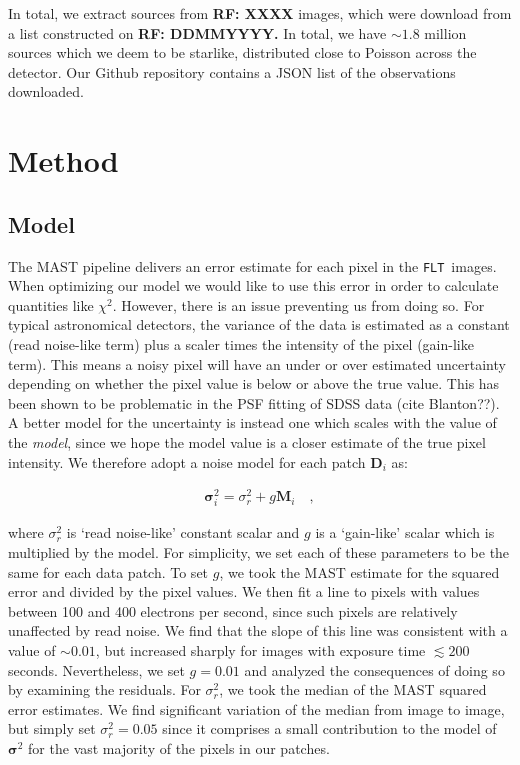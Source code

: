 \documentclass[12pt,letterpaper,preprint]{aastex}
\newcommand{\rf}[1]{\textbf{RF: #1}}
\newcommand{\vect}[1]{\mathbf{#1}}
\newcommand{\FLT}{\texttt{FLT}}
\newcommand{\data}{\vect{D}}
\newcommand{\model}{\vect{M}}
\newcommand{\var}{\vect{\sigma}^2}
\begin{document}
In total, we extract sources from \rf{XXXX} images, which were download from a list constructed on 
\rf{DDMMYYYY.}  In total, we have $\sim1.8$ million sources which we deem to be starlike, distributed 
close to Poisson across the detector.  Our Github repository contains a JSON list of the observations 
downloaded.

\section{Method}

\subsection{Model}

The MAST pipeline delivers an error estimate for each pixel in the \FLT\ images.   When optimizing 
our model we would like to use this error in order to calculate quantities like $\chi^2$.  However, 
there is an issue preventing us from doing so.  For typical astronomical detectors, the variance of 
the data is estimated as a constant (read noise-like term) plus a scaler times the intensity of the pixel 
(gain-like term).  This means a noisy pixel will have an under or over estimated uncertainty depending 
on whether the pixel value is below or above the true value.  This has been shown to be 
problematic in the PSF fitting of SDSS data (cite Blanton??).  A better model for the uncertainty is 
instead one which scales with the value of the \emph{model}, since we hope the model value is a 
closer estimate of the true pixel intensity.  We therefore adopt a noise model for each patch $\data_i$
as:

\begin{eqnarray}
\var_i =  \sigma_{r}^2 + g \model_i
\quad , 
\label{eqn:model-noflat}
\end{eqnarray}

\noindent where $\sigma_{r}^2$ is `read noise-like' constant scalar and $g$ is a `gain-like' scalar 
which is multiplied by the model.  For simplicity, we set each of these parameters to be the same 
for each data patch.  To set $g$, we took the MAST estimate for the squared error and 
divided by the pixel values.  We then fit a line to pixels with values between 100 and 
400 electrons per second, since such pixels are relatively unaffected by read noise.  We find that 
the slope of this line was consistent with a value of 
$\sim0.01$, but increased sharply for images with exposure time $\lesssim 200$ seconds.  
Nevertheless, we set $g=0.01$ and analyzed the consequences of doing so by examining the 
residuals.  For $\sigma_{r}^2$, we took the median of the MAST squared error estimates.  We find 
significant variation of the median from image to image, but simply set $\sigma_{r}^2=0.05$ since 
it comprises a small contribution to the model of $\var$ for the vast majority of the pixels in our 
patches.
\end{document}
